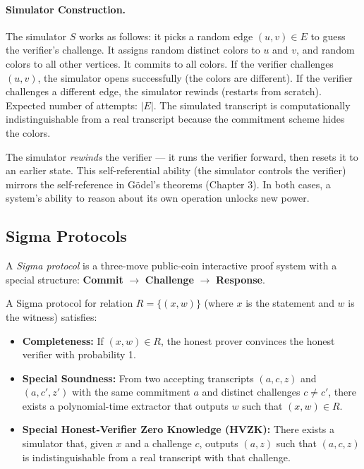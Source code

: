 \paragraph{Simulator Construction.} The simulator $S$ works as follows: it picks a random edge $(u,v) \in E$ to guess the verifier's challenge. It assigns random distinct colors to $u$ and $v$, and random colors to all other vertices. It commits to all colors. If the verifier challenges $(u,v)$, the simulator opens successfully (the colors are different). If the verifier challenges a different edge, the simulator rewinds (restarts from scratch). Expected number of attempts: $|E|$. The simulated transcript is computationally indistinguishable from a real transcript because the commitment scheme hides the colors.

The simulator \emph{rewinds} the verifier --- it runs the verifier forward, then resets it to an earlier state. This self-referential ability (the simulator controls the verifier) mirrors the self-reference in G\"odel's theorems (Chapter 3). In both cases, a system's ability to reason about its own operation unlocks new power.

\subsection{Sigma Protocols}
\label{sec:zk:sigma}

A \emph{Sigma protocol} is a three-move public-coin interactive proof system with a special structure: \textbf{Commit} $\to$ \textbf{Challenge} $\to$ \textbf{Response}.

\begin{definition}
A Sigma protocol for relation $R = \{(x,w)\}$ (where $x$ is the statement and $w$ is the witness) satisfies:
\begin{itemize}
\item \textbf{Completeness:} If $(x,w) \in R$, the honest prover convinces the honest verifier with probability 1.
\item \textbf{Special Soundness:} From two accepting transcripts $(a, c, z)$ and $(a, c', z')$ with the same commitment $a$ and distinct challenges $c \neq c'$, there exists a polynomial-time extractor that outputs $w$ such that $(x,w) \in R$.
\item \textbf{Special Honest-Verifier Zero Knowledge (HVZK):} There exists a simulator that, given $x$ and a challenge $c$, outputs $(a, z)$ such that $(a, c, z)$ is indistinguishable from a real transcript with that challenge.
\end{itemize}
\end{definition}

